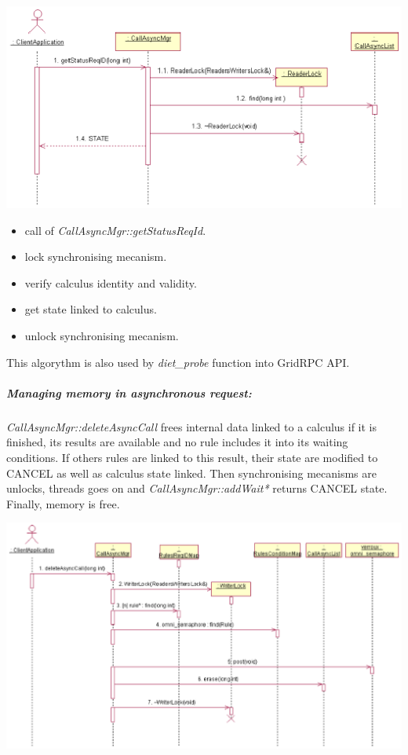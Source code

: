   \begin{center}
  \includegraphics{./fig/CallAsyncProbeSequenceDiagram1.ps}
  \end{center}

  \begin{itemize}
  \item call of \emph{CallAsyncMgr::getStatusReqId}.
  \item lock synchronising mecanism.
  \item verify calculus identity and validity.
  \item get state linked to calculus.
  \item unlock synchronising mecanism.
  \end{itemize}

  \noindent
   This algorythm is also used by \emph{diet\_probe} function
  into GridRPC API.

  \subparagraph{Managing memory in asynchronous request:}
  \emph{CallAsyncMgr::deleteAsyncCall} frees internal data linked to a 
  calculus if it is finished, its results are available and no rule includes
  it into its waiting conditions.
  If others rules are linked to this result, their state are modified to 
  CANCEL as well as calculus state linked. Then synchronising mecanisms
  are unlocks, threads goes on and \emph{CallAsyncMgr::addWait*} returns
  CANCEL state. Finally, memory is free.

  \begin{center}
  \includegraphics{./fig/DietCancelSequenceDiagram.ps}
  \end{center}

